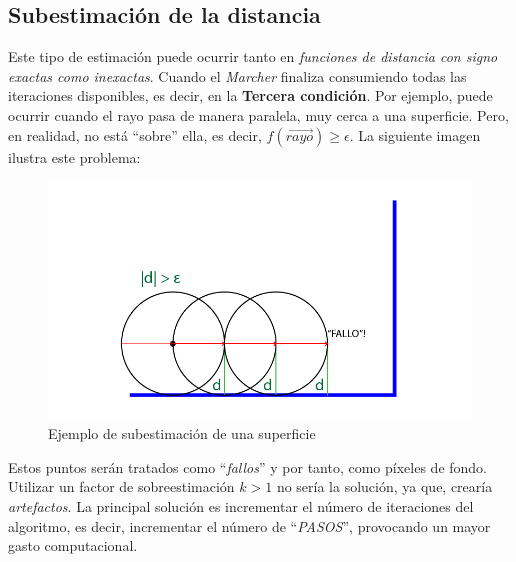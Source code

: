 \subsection{Subestimación de la distancia}
Este tipo de estimación puede ocurrir tanto en \textit{funciones de distancia con signo exactas como inexactas}. Cuando el \textit{Marcher} finaliza consumiendo todas las iteraciones disponibles, es decir, en la \textbf{Tercera condición}. Por ejemplo, puede ocurrir cuando el rayo pasa de manera paralela, muy cerca a una superficie. Pero, en realidad, no está \enquote{sobre} ella, es decir, \(f(\Vec{rayo}) \ge \epsilon\). La siguiente imagen ilustra este problema:

\begin{figure}[H]
  \centering
  \captionsetup{justification=centering}%
  \includegraphics[width=1.0\textwidth]{secciones/imagenes/estimation/subestimacion.png}
  \caption{Ejemplo de subestimación de una superficie}
  \label{fig:subestimacion}
\end{figure}

Estos puntos serán tratados como \enquote{\textit{fallos}} y por tanto, como píxeles de fondo. Utilizar un factor de sobreestimación \(k > 1\) no sería la solución, ya que, crearía \textit{artefactos}. La principal solución es incrementar el número de iteraciones del algoritmo, es decir, incrementar el número de \enquote{\textit{PASOS}}, provocando un mayor gasto computacional.